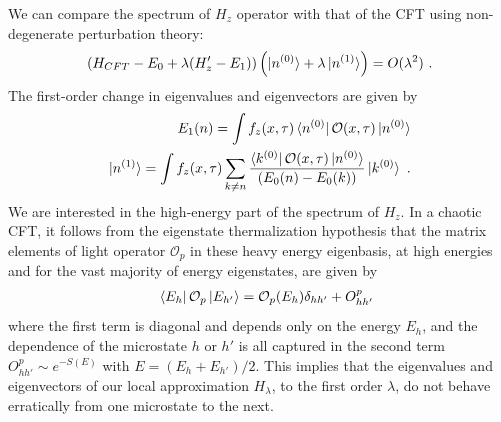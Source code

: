 \documentclass[a4paper,11pt]{article}
\theoremstyle{definition}
\newcommand{\nn}{\nonumber}
\newcommand{\lb}{\left(}
\newcommand{\rb}{\right)}
\newcommand{\mO}{\mathcal{O}}
\begin{document}
\begin{enumerate}
We can compare the spectrum of $H_z$ operator with that of the CFT using non-degenerate perturbation theory:
\begin{eqnarray}
    (H_{CFT}-E_0+\lambda (H'_z-E_1))\lb \ket{n^{(0)}}+\lambda\ket{n^{(1)}}\rb=O(\lambda^2)\ .
\end{eqnarray}
The first-order change in eigenvalues and eigenvectors are given by 
\begin{eqnarray}
    E_1(n)=\int f_z(x,\tau)\bra{n^{(0)}}\mO(x,\tau)\ket{n^{(0)}}\nn\\
    \ket{n^{(1)}}=\int f_z(x,\tau)\sum_{k\neq n}\frac{\bra{k^{(0)}}\mO(x,\tau)\ket{n^{(0)}}}{(E_0(n)-E_0(k))}\ket{k^{(0)}}\ .
\end{eqnarray}
We are interested in the high-energy part of the spectrum of $H_z$. In a chaotic CFT, it follows from the eigenstate thermalization hypothesis that the matrix elements of light operator $\mO_p$ in these heavy energy eigenbasis, at high energies and for the vast majority of energy eigenstates, are given by 
\begin{eqnarray}
&&\bra{E_h}\mO_p\ket{E_{h'}}=\mO_p(E_h)\delta_{hh'}+O^p_{hh'}
\end{eqnarray}
where the first term is diagonal and depends only on the energy $E_h$, and the dependence of the microstate $h$ or $h'$ is all captured in the second term $O^p_{hh'}\sim e^{-S(E)}$ with $E=(E_h+E_{h'})/2$. This implies that the eigenvalues and eigenvectors of our local approximation $H_\lambda$, to the first order $\lambda$, do not behave erratically from one microstate to the next. 

\end{enumerate}
\end{document}
